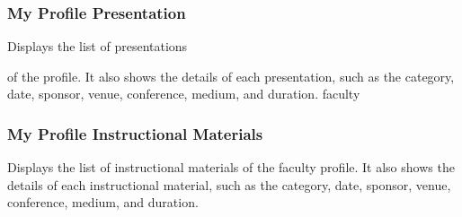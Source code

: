    \pagebreak
   
   \subsubsection{My Profile Presentation}
    
    
    
     {Displays the list of presentations}
    
  of the profile. It also shows the details of each presentation, such as the category, date, sponsor, venue, conference, medium, and duration. faculty   
    

    \pagebreak
    
    \subsubsection{My Profile Instructional Materials}
    
    
    
     {Displays the list of instructional materials of the faculty profile. It also shows the details of each instructional material, such as the category, date, sponsor, venue, conference, medium, and duration.}
    

